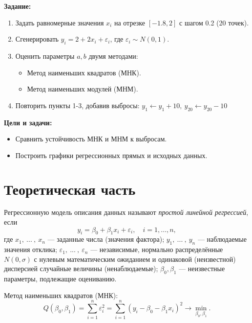 \documentclass[a4paper, 14pt]{extarticle}
\begin{document}
\textbf{Задание:}
\begin{enumerate}
    \item Задать равномерные значения $x_i$ на отрезке $[-1.8, 2]$ с шагом 0.2 (20 точек).
    \item Сгенерировать $y_i= 2 + 2x_i + \varepsilon_i$, где $\varepsilon_i \sim N(0, 1)$.
    \item Оценить параметры $a,b$ двумя методами:
    \begin{itemize}
        \item  Метод наименьших квадратов (МНК).
        \item  Метод наименьших модулей (МНМ).
    \end{itemize}
    \item Повторить пункты 1-3, добавив выбросы: $y_1\leftarrow y_1 + 10,\ y_{20}\leftarrow y_{20} - 10$
\end{enumerate}

\textbf{Цели и задачи:}
\begin{itemize}
    \item Сравнить устойчивость МНК и МНМ к выбросам.
    \item  Построить графики регрессионных прямых и исходных данных.
\end{itemize}

\section{Теоретическая часть}

Регрессионную модель описания данных называют \textit{простой линейной регрессией}, если
\begin{equation*}
    y_i = \beta_0 + \beta_1 x_i + \varepsilon_i, \quad i = 1, \dots, n,
\end{equation*}
где $x_1,\ ...\ ,\ x_n$ --- заданные числа (значения фактора); $y_1,\ ...\ ,\ y_n$ --- наблюдаемые значения отклика; $\varepsilon_1,\ ...\ ,\ \varepsilon_n$ --- независимые, нормально распределённые $N(0,\sigma)$ с нулевым математическим ожиданием и одинаковой (неизвестной) дисперсией случайные величины (ненаблюдаемые); $\beta_0,\beta_1$ --- неизвестные параметры, подлежащие оцениванию.


Метод наименьших квадратов (МНК):
\begin{equation*}
    Q(\beta_0, \beta_1) = \sum_{i=1}^n \varepsilon^2_i = \sum_{i=1}^n (y_i - \beta_0 - \beta_1 x_i)^2 \to \min_{\beta_0, \beta_1}.
\end{equation*}
\end{document}

